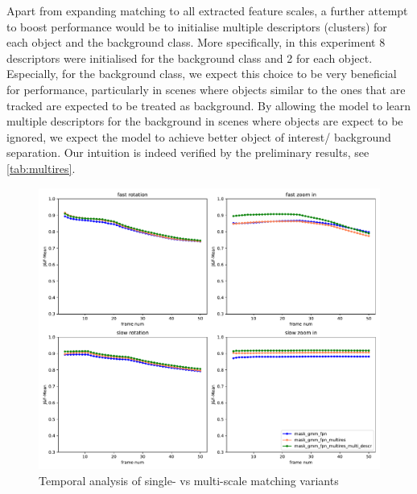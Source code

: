 Apart from expanding matching to all extracted feature scales, a further attempt to boost performance would be to initialise multiple descriptors (clusters) for each object and the background class. More specifically, in this experiment 8 descriptors were initialised for the background class and 2 for each object. Especially, for the background class, we expect this choice to be very beneficial for performance, particularly in scenes where objects similar to the ones that are tracked are expected to be treated as background. By allowing the model to learn multiple descriptors for the background in scenes where objects are expect to be ignored, we expect the model to achieve better object of interest/ background separation. Our intuition is indeed verified by the preliminary results, see \tabref\ref{tab:multires}. \par
\begin{figure}[ht!]
    \centering
    \includegraphics[width=1.\linewidth]{figures/04_experiments/multires_comparisons/mask_gmm_fpn-mask_gmm_fpn_multires-mask_gmm_fpn_multires_multi_descr-movement_all.pdf}
    \caption{Temporal analysis of single- vs multi-scale matching variants}
    \label{fig:multires_abl_all}
    
\end{figure}


